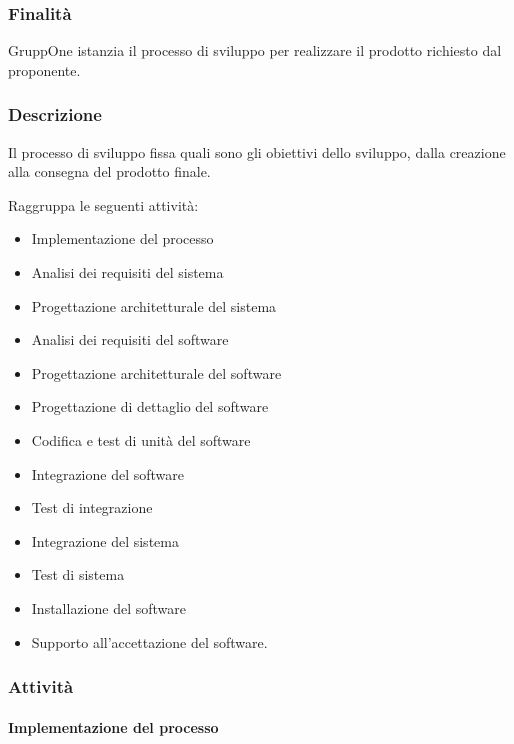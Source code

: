 \documentclass[../../norme-di-progetto.tex]{subfiles}
\begin{document}
\subsubsection{Finalità}%
\label{subs:sviluppo/finalita}

GruppOne istanzia il processo di sviluppo per realizzare il prodotto richiesto dal proponente.

\subsubsection{Descrizione}%
\label{subs:sviluppo/descrizione}

Il processo di sviluppo fissa quali sono gli obiettivi dello sviluppo, dalla creazione alla consegna del prodotto finale.

Raggruppa le seguenti attività:
\begin{itemize}
  \item Implementazione del processo
  \item Analisi dei requisiti del sistema
  \item Progettazione architetturale del sistema
  \item Analisi dei requisiti del software
  \item Progettazione architetturale del software
  \item Progettazione di dettaglio del software
  \item Codifica e test di unità del software
  \item Integrazione del software
  \item Test di integrazione
  \item Integrazione del sistema
  \item Test di sistema
  \item Installazione del software
  \item Supporto all'accettazione del software.
\end{itemize}

\subsubsection{Attività}%
\label{subs:sviluppo/attivita}

\paragraph{Implementazione del processo}%
\label{par:sviluppo/implementazione_del_processo}
\end{document}
